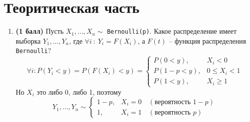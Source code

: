 \documentclass{assignment}
\begin{document}

\section*{Теоритическая часть}
\begin{enumerate}
    \item \textbf{(1 балл)} Пусть $X_1, \ldots, X_n \sim $ \texttt{Bernoulli(p)}. Какое распределение имеет выборка $Y_1, \ldots, Y_n$, где $\forall i~:~Y_i = F(X_i)$, а $F(t)$ -- функция распределения \texttt{Bernoulli}?
    \start
    \begin{equation}
        \forall i : P(Y_i < y) = P(F(X_i) < y) = \begin{cases}
            P(0 < y),& X_i < 0 \\
            P(1 - p < y),& 0 \leq X_i < 1 \\
            P(1 < y),& X_i \geq 1
        \end{cases}
    \end{equation}
    Но $X_i$ это либо 0, либо 1, поэтому
    \begin{equation}
        Y_1, \ldots, Y_n \sim \begin{cases}
            1 - p,& X_i = 0 \quad (\text{вероятность } 1-p) \\
            1,& X_i = 1 \quad (\text{вероятность } p)
        \end{cases}
    \end{equation}
    \finish


\end{enumerate}
\end{document}
